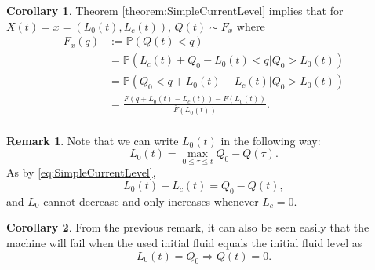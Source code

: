 \documentclass[a4paper]{thesis}
\theoremstyle{definition}
\newtheorem{remark}{Remark}[chapter]
\newtheorem{corollary}{Corollary}[chapter]
\begin{document}
\begin{corollary}\label{corollary:SimpleFluidDistribution}
	Theorem \ref{theorem:SimpleCurrentLevel} implies that for $X(t)=x=(L_0(t),L_c(t))$, $Q(t)\sim F_x$ where
	\begin{equation}\label{eq:SimpleCurrentDistribution}
	\begin{split}
	F_x(q)&:=\mathbb{P}(Q(t)<q)\\
	&=\mathbb{P}(L_c(t)+Q_0-L_0(t)<q|Q_0>L_0(t))\\
	&=\mathbb{P}(Q_0<q+L_0(t)-L_c(t)|Q_0>L_0(t))\\
	&=\frac{F(q+L_0(t)-L_c(t))-F(L_0(t))}{\bar{F}(L_0(t))}.\\
	\end{split}
	\end{equation}
\end{corollary}
\begin{remark}
	Note that we can write $L_0(t)$ in the following way:
	\[
	L_0(t)=\max\limits_{0\leq\tau\leq t} Q_0-Q(\tau).
	\]
	As by \eqref{eq:SimpleCurrentLevel}, 
	\[
	L_0(t)-L_c(t)=Q_0-Q(t),
	\]
	and $L_0$ cannot decrease and only increases whenever $L_c=0$.
\end{remark}
\begin{corollary}
	From the previous remark, it can also be seen easily that the machine will fail when the used initial fluid equals the initial fluid level as
	\[
	L_0(t)=Q_0\Rightarrow Q(t)=0.
	\]
\end{corollary}
\end{document}
